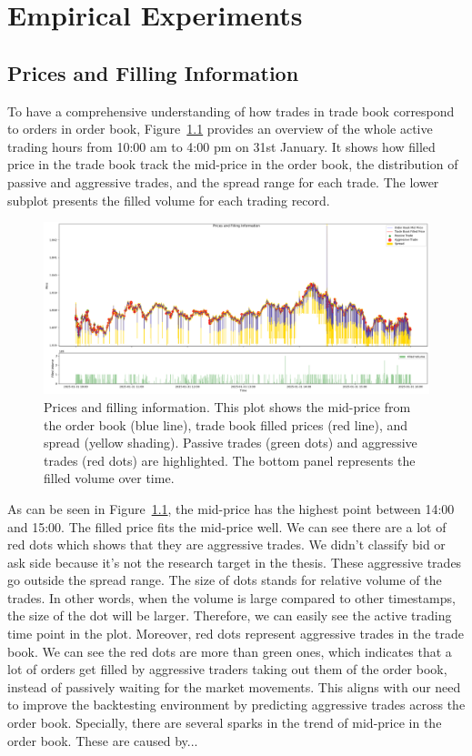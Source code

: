 \chapter{Empirical Experiments}\label{chapter:experiments}

\section{Prices and Filling Information}
To have a comprehensive understanding of how trades in trade book correspond to orders in order book, Figure~\ref{fig:p_f_i} provides an overview of the whole active trading hours from 10:00 am to 4:00 pm on 31st January. It shows how filled price in the trade book track the mid-price in the order book, the distribution of passive and aggressive trades, and the spread range for each trade. The lower subplot presents the filled volume for each trading record.
\begin{figure}[h]
    \centering
    \includegraphics[width=1\linewidth]{figures/Prices and Filling Information.png}
    \caption{Prices and filling information. This plot shows the mid-price from the order book (blue line), trade book filled prices (red line), and spread (yellow shading). Passive trades (green dots) and aggressive trades (red dots) are highlighted. The bottom panel represents the filled volume over time.}
    \label{fig:p_f_i}
\end{figure}
As can be seen in Figure~\ref{fig:p_f_i}, the mid-price has the highest point between 14:00 and 15:00. The filled price fits the mid-price well. We can see there are a lot of red dots which shows that they are aggressive trades. We didn't classify bid or ask side because it's not the research target in the thesis. These aggressive trades go outside the spread range. The size of dots stands for relative volume of the trades. In other words, when the volume is large compared to other timestamps, the size of the dot will be larger. Therefore, we can easily see the active trading time point in the plot. Moreover, red dots represent aggressive trades in the trade book. We can see the red dots are more than green ones, which indicates that a lot of orders get filled by aggressive traders taking out them of the order book, instead of passively waiting for the market movements. This aligns with our need to improve the backtesting environment by predicting aggressive trades across the order book. Specially, there are several sparks in the trend of mid-price in the order book. These are caused by...

